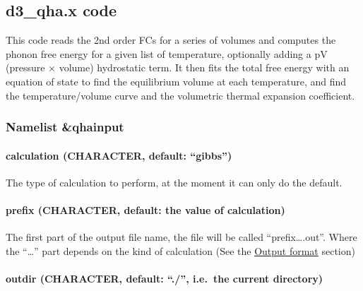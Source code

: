 \documentclass[
]{article}
\begin{document}
\hypertarget{d3_qha.x-code}{%
\subsection{d3\_qha.x code}\label{d3_qha.x-code}}

This code reads the 2nd order FCs for a series of volumes and computes
the phonon free energy for a given list of temperature, optionally
adding a pV (pressure × volume) hydrostatic term. It then fits the total
free energy with an equation of state to find the equilibrium volume at
each temperature, and find the temperature/volume curve and the
volumetric thermal expansion coefficient.

\hypertarget{namelist-qhainput}{%
\subsubsection{Namelist \&qhainput}\label{namelist-qhainput}}

\hypertarget{calculation-character-default-gibbs}{%
\paragraph{\texorpdfstring{calculation (CHARACTER, default:
\enquote{gibbs})}{calculation (CHARACTER, default: ``gibbs'')}}\label{calculation-character-default-gibbs}}

The type of calculation to perform, at the moment it can only do the
default.

\hypertarget{prefix-character-default-the-value-of-calculation-1}{%
\paragraph{prefix (CHARACTER, default: the value of
calculation)}\label{prefix-character-default-the-value-of-calculation-1}}

The first part of the output file name, the file will be called
\enquote{prefix\ldots.out}. Where the \enquote{\ldots{}} part depends on
the kind of calculation (See the
\protect\hyperlink{output-format-1}{Output format} section)

\hypertarget{outdir-character-default-.-i.e.-the-current-directory-1}{%
\paragraph{\texorpdfstring{outdir (CHARACTER, default: \enquote{./},
i.e.~the current
directory)}{outdir (CHARACTER, default: ``./'', i.e.~the current directory)}}\label{outdir-character-default-.-i.e.-the-current-directory-1}}
\end{document}
